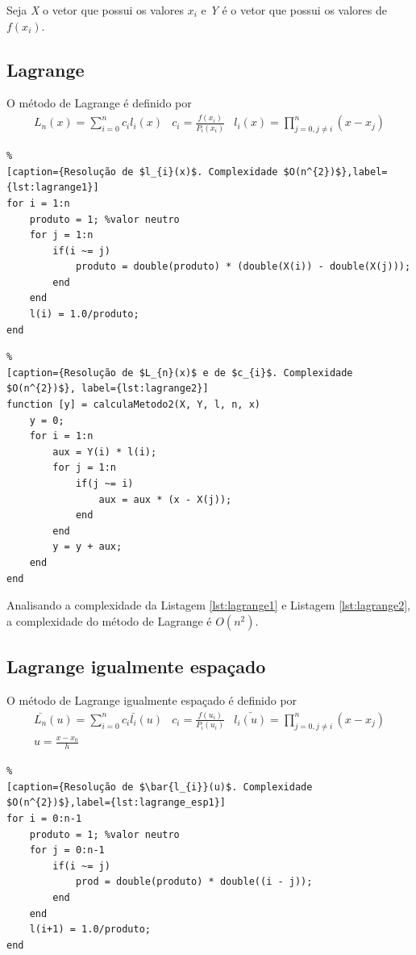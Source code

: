 \documentclass[conference]{IEEEtran}
\begin{document}
Seja \emph{X} o vetor que possui os valores $x_{i}$ e \emph{Y} é o vetor que possui os valores de $f(x_{i})$.

\subsection{Lagrange} \label{subsec:lagrange}
O método de Lagrange é definido por
$$
\begin{matrix}
L_{n}(x)=\sum_{i=0}^{n}c_{i}l_{i}(x) & c_{i}= \frac{f(x_{i})}{P_{i}(x_{i})}&l_i(x)=\prod_{j=0, j \neq i}^{n}(x - x_{j})
\end{matrix}
$$

\begin{lstlisting}%
[caption={Resolução de $l_{i}(x)$. Complexidade $O(n^{2})$},label={lst:lagrange1}]
for i = 1:n
    produto = 1; %valor neutro
    for j = 1:n
        if(i ~= j)
            produto = double(produto) * (double(X(i)) - double(X(j)));
        end
    end
    l(i) = 1.0/produto; 
end
\end{lstlisting}

\begin{lstlisting}%
[caption={Resolução de $L_{n}(x)$ e de $c_{i}$. Complexidade $O(n^{2})$}, label={lst:lagrange2}]
function [y] = calculaMetodo2(X, Y, l, n, x)
    y = 0;
    for i = 1:n
        aux = Y(i) * l(i);
        for j = 1:n
            if(j ~= i)
                aux = aux * (x - X(j));
            end
        end
        y = y + aux;
    end
end
\end{lstlisting}

Analisando a complexidade da Listagem \ref{lst:lagrange1} e Listagem \ref{lst:lagrange2}, a complexidade do método de Lagrange  é $O(n^{2})$.

\subsection{Lagrange igualmente espaçado} \label{subsec:lagrange_esp}
O método de Lagrange igualmente espaçado é definido por
$$
\begin{matrix}
\bar{L_{n}}(u)=\sum_{i=0}^{n}c_{i}\bar{l_{i}}(u) & c_{i}= \frac{f(u_{i})}{P_{i}(u_{i})}&\bar{l_i(u)}=\prod_{j=0, j \neq i}^{n}(x - x_{j}) 
\\ u=\frac{x-x_{0}}{h} & & 
\end{matrix}
$$

\begin{lstlisting}%
[caption={Resolução de $\bar{l_{i}}(u)$. Complexidade $O(n^{2})$},label={lst:lagrange_esp1}]
for i = 0:n-1
    produto = 1; %valor neutro
    for j = 0:n-1
        if(i ~= j)
            prod = double(produto) * double((i - j));
        end
    end
    l(i+1) = 1.0/produto;
end
\end{lstlisting}
\end{document}
